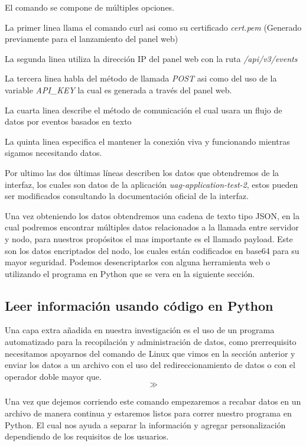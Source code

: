 El comando se compone de múltiples opciones.

La primer linea llama el comando curl asi como su certificado \textit{cert.pem} (Generado
previamente para el lanzamiento del panel web)

La segunda linea utiliza la dirección IP del panel web con la ruta \textit{/api/v3/events}

La tercera linea habla del método de llamada \textit{POST} asi como del uso de la variable
\textit{API\_KEY} la cual es generada a través del panel web.

La cuarta linea describe el método de comunicación el cual usara un flujo de datos por eventos
basados en texto

La quinta linea especifica el mantener la conexión viva y funcionando mientras sigamos necesitando
datos.

Por ultimo las dos últimas líneas describen los datos que obtendremos de la interfaz, los cuales son
datos de la aplicación \textit{uag-application-test-2}, estos pueden ser modificados consultando la
documentación oficial de la interfaz.

Una vez obteniendo los datos obtendremos una cadena de texto tipo JSON, en la cual podremos
encontrar múltiples datos relacionados a la llamada entre servidor y nodo, para nuestros propósitos
el mas importante es el llamado payload. Este son los datos encriptados del nodo, los cuales están
codificados en base64 para su mayor seguridad. Podemos desencriptarlos con alguna herramienta web o
utilizando el programa en Python que se vera en la siguiente sección.

\subsection{Leer información usando código en Python}

Una capa extra añadida en nuestra investigación es el uso de un programa automatizado para la
recopilación y administración de datos, como prerrequisito necesitamos apoyarnos del comando de
Linux que vimos en la sección anterior y enviar los datos a un archivo con el uso del
redireccionamiento de datos o con el operador doble mayor que. \[ \gg \]

Una vez que dejemos corriendo este comando empezaremos a recabar datos en un archivo de manera
continua y estaremos listos para correr nuestro programa en Python. El cual nos ayuda a separar la
información y agregar personalización dependiendo de los requisitos de los usuarios.

